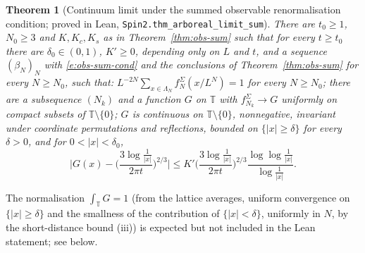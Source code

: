 \documentclass[11pt]{amsart}
\newtheorem{theorem}{Theorem}[section]
\theoremstyle{definition}
\theoremstyle{remark}
\numberwithin{equation}{section}
\newcommand{\T}{\mathbb{T}}
\begin{document}
\begin{theorem}[Continuum limit under the summed observable renormalisation condition; proved in Lean, \texttt{Spin2.thm\_arboreal\_limit\_sum}]\label{thm:limit-obs-sum}
There are $t_0\ge1$, $N_0\ge3$ and $K,K_c,K_s$ as in Theorem~\ref{thm:obs-sum} such that for every $t\ge t_0$ there are
$\delta_0\in(0,1)$, $K'\ge0$, depending only on $L$ and $t$, and a sequence $(\beta_N)_N$ with
\eqref{e:obs-sum-cond} and the conclusions of Theorem~\ref{thm:obs-sum} for every $N\ge N_0$, such that:
$L^{-2N}\sum_{x\in\Lambda_N}f^\Sigma_N(x/L^N)=1$ for every $N\ge N_0$;
there are a subsequence $(N_k)$ and a function $G$ on $\T$ with $f^\Sigma_{N_k}\to G$ uniformly on compact subsets of
$\T\setminus\{0\}$; $G$ is continuous on $\T\setminus\{0\}$, nonnegative, invariant under coordinate permutations
and reflections, bounded on $\{|x|\ge\delta\}$ for every $\delta>0$, and for $0<|x|<\delta_0$,
\begin{equation}
    \Biggl|G(x)-\Biggl(\frac{3\log\frac1{|x|}}{2\pi t}\Biggr)^{2/3}\Biggr|
    \le K'\Biggl(\frac{3\log\frac1{|x|}}{2\pi t}\Biggr)^{2/3}\frac{\log\log\frac1{|x|}}{\log\frac1{|x|}}.
\end{equation}
\end{theorem}

The normalisation $\int_\T G=1$ (from the lattice averages, uniform convergence on $\{|x|\ge\delta\}$ and the smallness
of the contribution of $\{|x|<\delta\}$, uniformly in $N$, by the short-distance bound (iii)) is expected but not
included in the Lean statement; see below.
\end{document}
